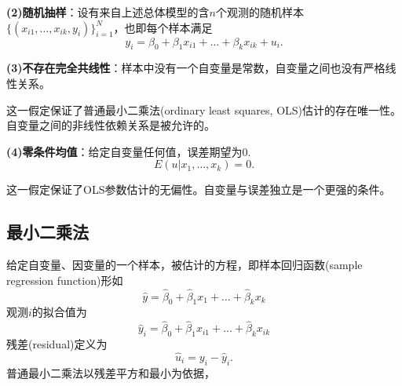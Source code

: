 \par \textbf{(2)随机抽样}：设有来自上述总体模型的含$n$个观测的随机样本$\{(x_{i1}, \dots, x_{ik}, y_i)\}_{i=1}^N$，也即每个样本满足
\begin{equation}
    y_i=\beta_0+\beta_1 x_{i1}+\dots+\beta_k x_{ik} +u_i.
\end{equation}

\par \textbf{(3)不存在完全共线性}：样本中没有一个自变量是常数，自变量之间也没有严格线性关系。
\par 这一假定保证了普通最小二乘法(ordinary least squares, OLS)估计的存在唯一性。自变量之间的非线性依赖关系是被允许的。

\par \textbf{(4)零条件均值}：给定自变量任何值，误差期望为0.
\begin{equation}
    E(u\vert x_1, \dots, x_k)=0.
\end{equation}
\par 这一假定保证了OLS参数估计的无偏性。自变量与误差独立是一个更强的条件。

\subsection{最小二乘法}

\par 给定自变量、因变量的一个样本，被估计的方程，即样本回归函数(sample regression function)形如
\begin{equation}
    \hat{y}=\hat{\beta}_0+\hat{\beta}_1 x_1+\dots+\hat{\beta}_k x_k
\end{equation}
观测$i$的拟合值为
\begin{equation}
    \hat{y}_i=\hat{\beta}_0+\hat{\beta}_1 x_{i1}+\dots+\hat{\beta}_k x_{ik}
\end{equation}
残差(residual)定义为
\begin{equation}
    \hat{u}_i = y_i-\hat{y}_i.
\end{equation}
普通最小二乘法以残差平方和最小为依据，